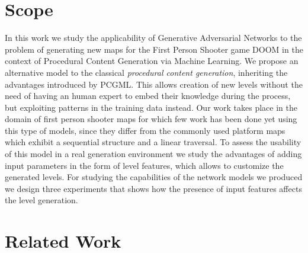 \section{Scope}
\label{sec:scope}
In this work we study the applicability of Generative Adversarial Networks to the problem of generating new maps for the First Person Shooter game DOOM in the context of Procedural Content Generation via Machine Learning. We propose an alternative model to the classical \textit{procedural content generation}, inheriting the advantages introduced by PCGML. This allows creation of new levels without the need of having an human expert to embed their knowledge during the process, but exploiting patterns in the training data instead. Our work takes place in the domain of first person shooter maps for which few work has been done yet using this type of models, since they differ from the commonly used platform maps which exhibit a sequential structure and a linear traversal. To assess the usability of this model in a real generation environment we study the advantages of adding input parameters in the form of level features, which allows to customize the generated levels. For studying the capabilities of the network models we produced we design three experiments that shows how the presence of input features affects the level generation. 

\section{Related Work}
\label{sec:relatedwork}
